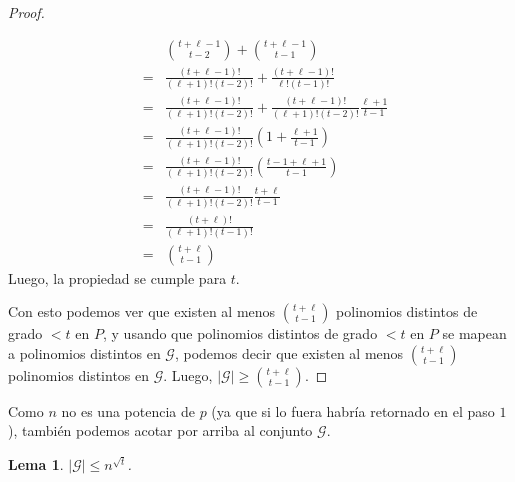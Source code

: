 \documentclass[10pt]{article}
\newcommand{\0}{\mathbf{0}}
\newcommand{\1}{\mathbf{1}}
\newcommand{\+}{\oplus}
\newtheorem{lemma}[theorem]{Lema}
\theoremstyle{remark}
\theoremstyle{remark}
\begin{document}
\begin{proof}
\begin{itemize}
\begin{eqnarray}
			& &{{t+\ell -1}\choose{t-2}}+{{t+\ell -1}\choose{t-1}}\nonumber\\
			&= &\frac{(t+\ell -1)!}{(\ell +1)!(t-2)!}+\frac{(t+\ell -1)!}{\ell !(t-1)!}\nonumber\\
			&= &\frac{(t+\ell -1)!}{(\ell +1)!(t-2)!}+\frac{(t+\ell -1)!}{(\ell +1)!(t-2)!}\frac{\ell +1}{t-1}\nonumber\\
			&= &\frac{(t+\ell -1)!}{(\ell +1)!(t-2)!}(1+\frac{\ell +1}{t-1})\nonumber\\
			&= &\frac{(t+\ell -1)!}{(\ell +1)!(t-2)!}(\frac{t-1+\ell +1}{t-1})\nonumber\\
			&= &\frac{(t+\ell -1)!}{(\ell +1)!(t-2)!}\frac{t+\ell }{t-1}\nonumber\\
			&= &\frac{(t+\ell )!}{(\ell +1)!(t-1)!}\nonumber\\
			&=& {{t+\ell }\choose{t-1}}\nonumber
			\end{eqnarray}
			Luego, la propiedad se cumple para $t$.
		\end{itemize}
		Con esto podemos ver que existen al menos ${{t+\ell }\choose{t-1}}$ polinomios distintos de grado $<t$ en $P$, y usando que polinomios distintos de grado $<t$ en $P$ se mapean a polinomios distintos en $\mathcal{G}$, podemos decir que existen al menos ${{t+\ell }\choose{t-1}}$ polinomios distintos en $\mathcal{G}$. Luego, $|\mathcal{G}|\geq {{t+\ell }\choose{t-1}}$.
		
	\end{proof}
	Como $n$ no es una potencia de $p$ (ya que si lo fuera habrí­a retornado en el paso $1$), también podemos acotar por arriba al conjunto $\mathcal{G}$.
	\begin{lemma}
		$|\mathcal{G}|\leq n^{\sqrt{t}}$.
	\end{lemma}
\end{document}
